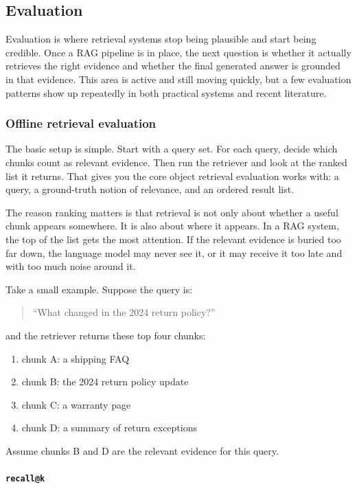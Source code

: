 \documentclass[12pt]{article}
\begin{document}
\subsection{Evaluation}

Evaluation is where retrieval systems stop being plausible and start being
credible. Once a RAG pipeline is in place, the next question is whether
it actually retrieves the right evidence and whether the final generated
answer is grounded in that evidence. This area is active and still moving
quickly, but a few evaluation patterns show up repeatedly in both
practical systems and recent literature.

\subsubsection{Offline retrieval evaluation}

The basic setup is simple. Start with a query set. For each query, decide
which chunks count as relevant evidence. Then run the retriever and look
at the ranked list it returns. That gives you the core object retrieval
evaluation works with: a query, a ground-truth notion of relevance, and
an ordered result list.

The reason ranking matters is that retrieval is not only about whether a
useful chunk appears somewhere. It is also about where it appears. In a
RAG system, the top of the list gets the most attention. If the relevant
evidence is buried too far down, the language model may never see it, or
it may receive it too late and with too much noise around it.

Take a small example. Suppose the query is:
\begin{quote}
``What changed in the 2024 return policy?''
\end{quote}
and the retriever returns these top four chunks:
\begin{enumerate}
    \item chunk A: a shipping FAQ
    \item chunk B: the 2024 return policy update
    \item chunk C: a warranty page
    \item chunk D: a summary of return exceptions
\end{enumerate}
Assume chunks B and D are the relevant evidence for this query.

\paragraph{\texttt{recall@k}}
\end{document}
